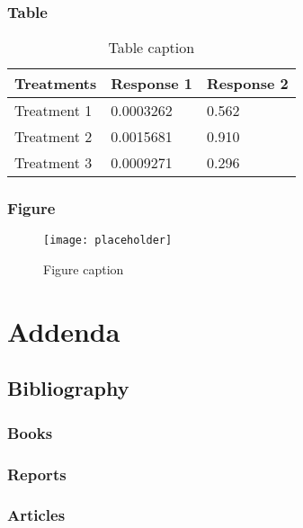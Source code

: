 \documentclass[11pt,fleqn,,a4paper,twoside,openright]{book}
\begin{document}
\section{Table}

\begin{table}[h]
\centering
\begin{tabular}{l l l}
\toprule
\textbf{Treatments} & \textbf{Response 1} & \textbf{Response 2}\\
\midrule
Treatment 1 & 0.0003262 & 0.562 \\
Treatment 2 & 0.0015681 & 0.910 \\
Treatment 3 & 0.0009271 & 0.296 \\
\bottomrule
\end{tabular}
\caption{Table caption}
\end{table}

\section{Figure}

\begin{figure}[h]
\centering\texttt{[image: placeholder]}
\caption{Figure caption}
\end{figure}

\part{Addenda}

\chapter*{Bibliography}
\section*{Books}
\printbibliography[heading=bibempty,type=book]
\section*{Reports}
\printbibliography[heading=bibempty,type=report]
\section*{Articles}
\printbibliography[heading=bibempty,type=article]
\end{document}
